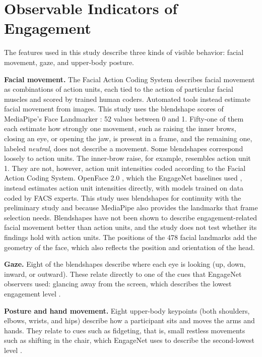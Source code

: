 
\section{Observable Indicators of Engagement}
\label{sec:indicators}

The features used in this study describe three kinds of visible behavior: facial movement, gaze, and upper-body posture.

\textbf{Facial movement.} The Facial Action Coding System \cite{ekman1978} describes facial movement as combinations of action units, each tied to the action of particular facial muscles and scored by trained human coders. Automated tools instead estimate facial movement from images. This study uses the blendshape scores of MediaPipe's Face Landmarker \cite{lugaresi2019}: 52 values between 0 and 1. Fifty-one of them each estimate how strongly one movement, such as raising the inner brows, closing an eye, or opening the jaw, is present in a frame, and the remaining one, labeled \emph{neutral}, does not describe a movement. Some blendshapes correspond loosely to action units. The inner-brow raise, for example, resembles action unit 1. They are not, however, action unit intensities coded according to the Facial Action Coding System. OpenFace 2.0 \cite{baltrusaitis2018}, which the EngageNet baselines used \cite{singh2023}, instead estimates action unit intensities directly, with models trained on data coded by FACS experts. This study uses blendshapes for continuity with the preliminary study and because MediaPipe also provides the landmarks that frame selection needs. Blendshapes have not been shown to describe engagement-related facial movement better than action units, and the study does not test whether its findings hold with action units. The positions of the 478 facial landmarks add the geometry of the face, which also reflects the position and orientation of the head.

\textbf{Gaze.} Eight of the blendshapes describe where each eye is looking (up, down, inward, or outward). These relate directly to one of the cues that EngageNet observers used: glancing away from the screen, which describes the lowest engagement level \cite{singh2023}.

\textbf{Posture and hand movement.} Eight upper-body keypoints (both shoulders, elbows, wrists, and hips) describe how a participant sits and moves the arms and hands. They relate to cues such as fidgeting, that is, small restless movements such as shifting in the chair, which EngageNet uses to describe the second-lowest level \cite{singh2023}.


